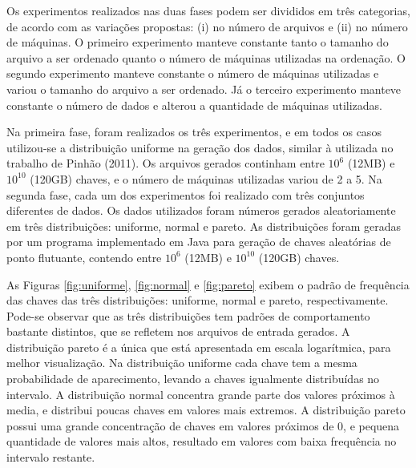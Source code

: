 
Os experimentos realizados nas duas fases podem ser divididos em três categorias, de acordo com as variações propostas: (i) no número de arquivos e (ii) no número de máquinas. 
O primeiro experimento manteve constante tanto o tamanho do arquivo a ser ordenado quanto o número de máquinas utilizadas na ordenação. 
O segundo experimento manteve constante o número de máquinas utilizadas e variou o tamanho do arquivo a ser ordenado. 
Já o terceiro experimento manteve constante o número de dados e alterou a quantidade de máquinas utilizadas. 

Na primeira fase, foram realizados os três experimentos, e em todos os casos utilizou-se a distribuição uniforme na geração dos dados, similar à utilizada no trabalho de Pinhão (2011). Os arquivos gerados continham entre $10^{6}$ (12MB) e  $10^{10}$ (120GB) chaves, e o número de máquinas utilizadas variou de 2 a 5.
Na segunda fase, cada um dos experimentos foi realizado com três conjuntos diferentes de dados.
Os dados utilizados foram números gerados aleatoriamente em três distribuições: uniforme, normal e pareto. As distribuições foram geradas por um programa implementado em Java para geração de chaves aleatórias de ponto flutuante, contendo entre $10^{6}$ (12MB) e  $10^{10}$ (120GB) chaves. 

As Figuras \ref{fig:uniforme}, \ref{fig:normal} e \ref{fig:pareto} exibem o padrão de frequência das chaves das três distribuições: uniforme, normal e pareto, respectivamente. 
Pode-se observar que as três distribuições tem padrões de comportamento bastante distintos, que se refletem nos arquivos de entrada gerados. A distribuição pareto é a única que está apresentada em escala logarítmica, para melhor visualização. 
Na distribuição uniforme cada chave tem a mesma probabilidade de aparecimento, levando a chaves igualmente distribuídas no intervalo. A distribuição normal concentra grande parte dos valores próximos à media, e distribui poucas chaves em valores mais extremos. A distribuição pareto possui uma grande concentração de chaves em valores próximos de 0, e pequena quantidade de valores mais altos, resultado em valores com baixa frequência no intervalo restante. %

